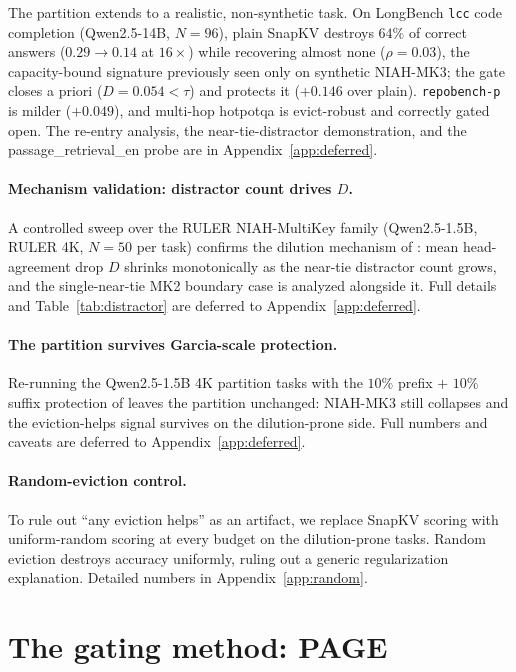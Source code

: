 \documentclass{article}
\newcommand{\method}{PAGE\xspace}
\begin{document}
The partition extends to a realistic, non-synthetic task. On LongBench
\texttt{lcc} code completion (Qwen2.5-14B, $N = 96$), plain SnapKV destroys
$64\%$ of correct answers ($0.29 \to 0.14$ at $16\times$) while recovering
almost none ($\rho = 0.03$), the capacity-bound signature previously seen only
on synthetic NIAH-MK3; the gate closes a priori ($D = 0.054 < \tau$) and protects
it ($+0.146$ over plain). \texttt{repobench-p} is milder ($+0.049$), and
multi-hop hotpotqa is evict-robust and correctly gated open. The re-entry
analysis, the near-tie-distractor demonstration, and the passage\_retrieval\_en
probe are in Appendix~\ref{app:deferred}.

\paragraph{Mechanism validation: distractor count drives $D$.} A
controlled sweep over the RULER NIAH-MultiKey family (Qwen2.5-1.5B,
RULER 4K, $N = 50$ per task) confirms the dilution mechanism of
\citet{arxiv260509649}: mean head-agreement drop $D$ shrinks
monotonically as the near-tie distractor count grows, and the
single-near-tie MK2 boundary case is analyzed alongside it. Full
details and Table~\ref{tab:distractor} are deferred to
Appendix~\ref{app:deferred}.

\paragraph{The partition survives Garcia-scale protection.} Re-running the
Qwen2.5-1.5B 4K partition tasks with the $10\%$ prefix $+$ $10\%$ suffix
protection of \citet{arxiv260518053} leaves the partition unchanged: NIAH-MK3
still collapses and the eviction-helps signal survives on the dilution-prone
side. Full numbers and caveats are deferred to Appendix~\ref{app:deferred}.

\paragraph{Random-eviction control.} To rule out ``any eviction helps'' as an
artifact, we replace SnapKV scoring with uniform-random scoring at every
budget on the dilution-prone tasks. Random eviction destroys accuracy uniformly,
ruling out a generic regularization explanation. Detailed numbers in
Appendix~\ref{app:random}.

\section{The gating method: \method}
\label{sec:method}
\end{document}
